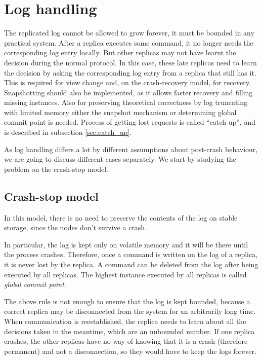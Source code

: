 \section{Log handling}
The replicated log cannot be allowed to grow forever, it must be bounded in any practical system. After a replica executes some command, it no longer needs the corresponding log entry locally. But other replicas may not have learnt the decision during the normal protocol. In this case, these late replicas need to learn the decision by asking the corresponding log entry from a replica that still has it. This is required for view change and, on the crash-recovery model, for recovery. Snapshotting should also be implemented, as it allows faster recovery and filling missing instances. Also for preserving theoretical correctness by log truncating with limited memory either the snapshot mechanism or determining global commit point is needed. Process of getting lost requests is called ``catch-up'', and is described in subsection \ref{sec:catch_up}.

As log handling differs a lot by different assumptions about post-crash behaviour, we are going to discuss different cases separately.
We start by studying the problem on the crash-stop model.

\subsection{Crash-stop model}
\label{subsec:crash_stop_model}
In this model, there is no need to preserve the contents of the log on stable storage, since the nodes don't survive a crash.

In particular, the log is kept only on volatile memory and it will be there until the process crashes. Therefore, once a command is written on the log of a replica, it is never lost by the replica. A command can be deleted from the log after being executed by all replicas. The highest instance executed by all replicas is called \emph{global commit point}.

The above rule is not enough to ensure that the log is kept bounded, because a correct replica may be disconnected from the system for an arbitrarily long time. When communication is reestablished, the replica needs to learn about all the decisions taken in the meantime, which are an unbounded number. If one replica crashes, the other replicas have no way of knowing that it is a crash (therefore permanent) and not a disconnection, so they would have to keep the logs forever.

